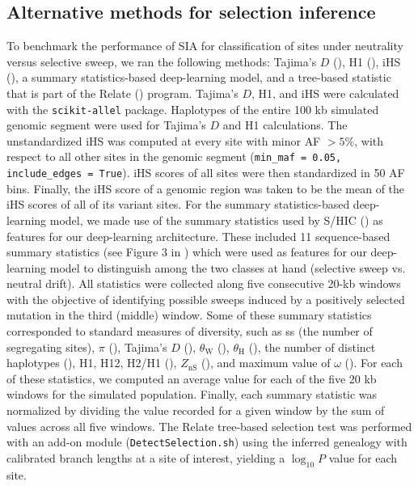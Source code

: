 \subsection{Alternative methods for selection inference}
To benchmark the performance of \ac{SIA} for classification of sites under neutrality versus selective sweep, we ran the following methods: Tajima’s $D$ (\cite{tajima_statistical_1989}), H1 (\cite{garud_recent_2015}), iHS (\cite{voight_map_2006}), a summary statistics-based deep-learning model, and a tree-based statistic that is part of the Relate (\cite{speidel_method_2019}) program. Tajima’s $D$, H1, and iHS were calculated with the \texttt{scikit-allel} package. Haplotypes of the entire 100 kb simulated genomic segment were used for Tajima’s $D$ and H1 calculations. The unstandardized iHS was computed at every site with minor \ac{AF} $>5\%$, with respect to all other sites in the genomic segment (\texttt{min\_maf = 0.05, include\_edges = True}). iHS scores of all sites were then standardized in 50 \ac{AF} bins. Finally, the iHS score of a genomic region was taken to be the mean of the iHS scores of all of its variant sites. For the summary statistics-based deep-learning model, we made use of the summary statistics used by S/HIC (\cite{schrider_shic_2016,kern_diploshic_2018}) as features for our deep-learning architecture. These included 11 sequence-based summary statistics (see Figure 3 in \cite{schrider_supervised_2018}) which were used as features for our deep-learning model to distinguish among the two classes at hand (selective sweep vs. neutral drift). All statistics were collected along five consecutive 20-kb windows with the objective of identifying possible sweeps induced by a positively selected mutation in the third (middle) window. Some of these summary statistics corresponded to standard measures of diversity, such as ss (the number of segregating sites), $\pi$ (\cite{nei_mathematical_1979}), Tajima’s $D$ (\cite{tajima_statistical_1989}), $\theta_{\mathrm{W}}$ (\cite{watterson_number_1975}), $\theta_{\mathrm{H}}$ (\cite{fay_hitchhiking_2000}), the number of distinct haplotypes (\cite{messer_population_2013}), H1, H12, H2/H1 (\cite{garud_recent_2015}), $Z_{\mathrm{nS}}$ (\cite{kelly_test_1997}), and maximum value of $\omega$ (\cite{kim_linkage_2004}). For each of these statistics, we computed an average value for each of the five 20 kb windows for the simulated population. Finally, each summary statistic was normalized by dividing the value recorded for a given window by the sum of values across all five windows. The Relate tree-based selection test was performed with an add-on module (\texttt{DetectSelection.sh}) using the inferred genealogy with calibrated branch lengths at a site of interest, yielding a $\log_{10}P$ value for each site.

